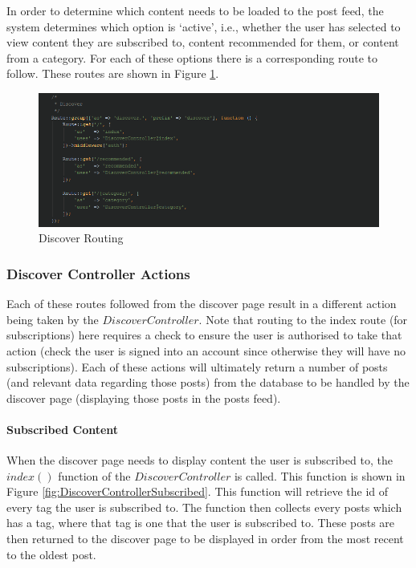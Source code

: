 In order to determine which content needs to be loaded to the post feed, the system determines which option is `active', i.e., whether the user has selected to view content they are subscribed to, content recommended for them, or content from a category. For each of these options there is a corresponding route to follow. These routes are shown in Figure \ref{fig:DiscoverRouting}.

\begin{figure}[H]
\centering
\includegraphics[width=\textwidth]{Images/Implementation/DiscoverRouting}
\caption{Discover Routing}
\label{fig:DiscoverRouting}
\end{figure}

\subsubsection{Discover Controller Actions}
Each of these routes followed from the discover page result in a different action being taken by the $DiscoverController$. Note that routing to the index route (for subscriptions) here requires a check to ensure the user is authorised to take that action (check the user is signed into an account since otherwise they will have no subscriptions). Each of these actions will ultimately return a number of posts (and relevant data regarding those posts) from the database to be handled by the discover page (displaying those posts in the posts feed).

\paragraph{Subscribed Content}
When the discover page needs to display content the user is subscribed to, the $index()$ function of the $DiscoverController$ is called. This function is shown in Figure \ref{fig:DiscoverControllerSubscribed}. This function will retrieve the id of every tag the user is subscribed to. The function then collects every posts which has a tag, where that tag is one that the user is subscribed to. These posts are then returned to the discover page to be displayed in order from the most recent to the oldest post.


